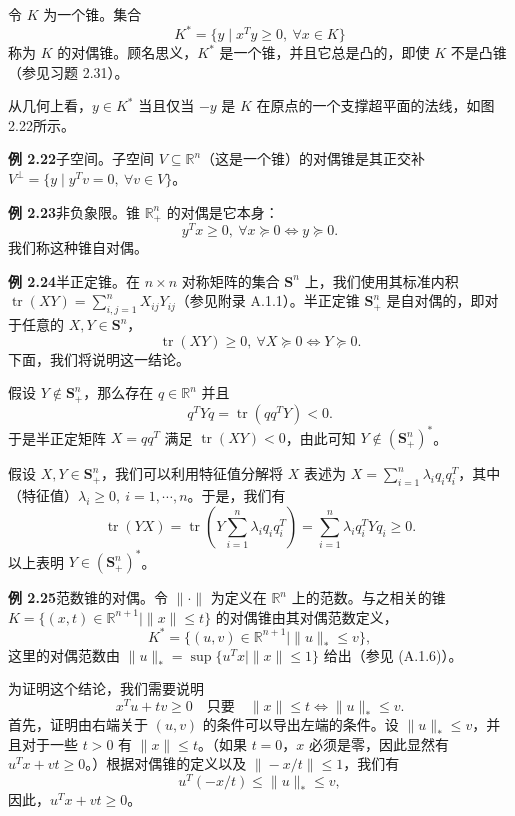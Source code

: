 \documentclass[UTF8, 12pt, fontset=fandol, oneside]{ctexart}
\begin{document}
令 $K$ 为一个锥。集合
\begin{equation}
  K^*=\{y\mid x^Ty\ge0,\ \forall x\in K\}
  \tag{2.19}
\end{equation}
称为 $K$ 的对偶锥。顾名思义，$K^*$ 是一个锥，并且它总是凸的，即使 $K$ 不是凸锥（参见习题 2.31）。

从几何上看，$y\in K^*$ 当且仅当 $-y$ 是 $K$ 在原点的一个支撑超平面的法线，如图2.22所示。

\noindent\textbf{例 2.22}\quad 子空间。子空间 $V\subseteq\mathbb{R}^n$（这是一个锥）的对偶锥是其正交补 $V^\perp=\{y\mid y^Tv=0,\ \forall v\in V\}$。

\noindent\textbf{例 2.23}\quad 非负象限。锥 $\mathbb{R}_+^n$ 的对偶是它本身：
\[
  y^Tx\ge0,\ \forall x\succeq0\Longleftrightarrow y\succeq0.
\]
我们称这种锥自对偶。

\noindent\textbf{例 2.24}\quad 半正定锥。在 $n\times n$ 对称矩阵的集合 $\mathbf{S}^n$ 上，我们使用其标准内积 $\operatorname{tr}(XY)=\sum_{i,j=1}^n X_{ij}Y_{ij}$（参见附录 A.1.1）。半正定锥 $\mathbf{S}_+^n$ 是自对偶的，即对于任意的 $X,Y\in\mathbf{S}^n$，
\[
  \operatorname{tr}(XY)\ge0,\ \forall X\succeq0 \Longleftrightarrow Y\succeq0.
\]
下面，我们将说明这一结论。

假设 $Y\notin\mathbf{S}_+^n$，那么存在 $q\in\mathbb{R}^n$ 并且
\[
  q^TYq=\operatorname{tr}(qq^TY)<0.
\]
于是半正定矩阵 $X=qq^T$ 满足 $\operatorname{tr}(XY)<0$，由此可知 $Y\notin(\mathbf{S}_+^n)^*$。

假设 $X,Y\in\mathbf{S}_+^n$，我们可以利用特征值分解将 $X$ 表述为 $X=\sum_{i=1}^n\lambda_iq_iq_i^T$，其中（特征值）$\lambda_i\ge0,\ i=1,\cdots,n$。于是，我们有
\[
  \operatorname{tr}(YX)=\operatorname{tr}\left(Y\sum_{i=1}^n\lambda_iq_iq_i^T\right)
  =\sum_{i=1}^n\lambda_iq_i^TYq_i\ge0.
\]
以上表明 $Y\in(\mathbf{S}_+^n)^*$。

\noindent\textbf{例 2.25}\quad 范数锥的对偶。令 $\|\cdot\|$ 为定义在 $\mathbb{R}^n$ 上的范数。与之相关的锥 $K=\{(x,t)\in\mathbb{R}^{n+1}\mid\|x\|\le t\}$ 的对偶锥由其对偶范数定义，
\[
  K^*=\{(u,v)\in\mathbb{R}^{n+1}\mid \|u\|_*\le v\},
\]
这里的对偶范数由 $\|u\|_*=\sup\{u^Tx\mid\|x\|\le1\}$ 给出（参见 (A.1.6)）。

为证明这个结论，我们需要说明
\begin{equation}
  x^Tu+tv\ge0\quad \text{只要}\quad \|x\|\le t
  \Longleftrightarrow \|u\|_*\le v.
  \tag{2.20}
\end{equation}
首先，证明由右端关于 $(u,v)$ 的条件可以导出左端的条件。设 $\|u\|_*\le v$，并且对于一些 $t>0$ 有 $\|x\|\le t$。（如果 $t=0$，$x$ 必须是零，因此显然有 $u^Tx+vt\ge0$。）根据对偶锥的定义以及 $\|-x/t\|\le1$，我们有
\[
  u^T(-x/t)\le\|u\|_*\le v,
\]
因此，$u^Tx+vt\ge0$。
\end{document}
